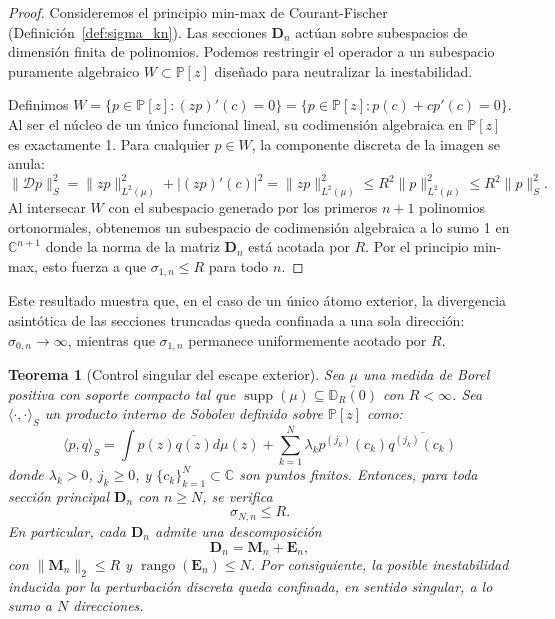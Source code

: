 \documentclass[12pt,a4paper]{article}
\newtheorem{theorem}{Teorema}
\theoremstyle{definition}
\theoremstyle{remark}
\newcommand{\Poly}{\mathbb{P}[z]}
\newcommand{\D}{\mathcal{D}}
\begin{document}
\begin{proof}
  Consideremos el principio min-max de Courant-Fischer (Definición~\ref{def:sigma_kn}). Las secciones $\mathbf{D}_n$ actúan sobre subespacios de dimensión finita de polinomios. Podemos restringir el operador a un subespacio puramente algebraico $W \subset \Poly$ diseñado para neutralizar la inestabilidad.

  Definimos $W = \{ p \in \Poly : (zp)'(c) = 0 \} = \{ p \in \Poly : p(c) + c p'(c) = 0 \}$. Al ser el núcleo de un único funcional lineal, su codimensión algebraica en $\Poly$ es exactamente 1. Para cualquier $p \in W$, la componente discreta de la imagen se anula:
  $$ \|\D p\|_S^2 = \|zp\|_{L^2(\mu)}^2 + |(zp)'(c)|^2 = \|zp\|_{L^2(\mu)}^2 \le R^2 \|p\|_{L^2(\mu)}^2 \le R^2 \|p\|_S^2. $$
  Al intersecar $W$ con el subespacio generado por los primeros $n+1$ polinomios ortonormales, obtenemos un subespacio de codimensión algebraica a lo sumo 1 en $\mathbb{C}^{n+1}$ donde la norma de la matriz $\mathbf{D}_n$ está acotada por $R$. Por el principio min-max, esto fuerza a que $\sigma_{1,n} \le R$ para todo $n$.
\end{proof}

Este resultado muestra que, en el caso de un único átomo exterior, la divergencia asintótica de las secciones truncadas queda confinada a una sola dirección: $\sigma_{0,n} \to \infty$, mientras que $\sigma_{1,n}$ permanece uniformemente acotado por $R$.

\begin{theorem}[Control singular del escape exterior]\label{thm:control_singular_escape}
  Sea $\mu$ una medida de Borel positiva con soporte compacto tal que $\operatorname{supp}(\mu) \subseteq \overline{\mathbb{D}_R(0)}$ con $R < \infty$. Sea $\langle \cdot, \cdot \rangle_S$ un producto interno de Sobolev definido sobre $\Poly$ como:
  \begin{equation}\label{eq:sobolev_general_singular}
    \langle p, q \rangle_S = \int p(z)\overline{q(z)} d\mu(z) + \sum_{k=1}^N \lambda_k p^{(j_k)}(c_k) \overline{q^{(j_k)}(c_k)}
  \end{equation}
  donde $\lambda_k > 0$, $j_k \ge 0$, y $\{c_k\}_{k=1}^N \subset \mathbb{C}$ son puntos finitos. Entonces, para toda sección principal $\mathbf{D}_n$ con $n \ge N$, se verifica
  \[
    \sigma_{N,n} \le R.
  \]
  En particular, cada $\mathbf{D}_n$ admite una descomposición
  \[
    \mathbf{D}_n = \mathbf{M}_n + \mathbf{E}_n,
  \]
  con $\|\mathbf{M}_n\|_2 \le R$ y $\operatorname{rango}(\mathbf{E}_n) \le N$. Por consiguiente, la posible inestabilidad inducida por la perturbación discreta queda confinada, en sentido singular, a lo sumo a $N$ direcciones.
\end{theorem}
\end{document}

